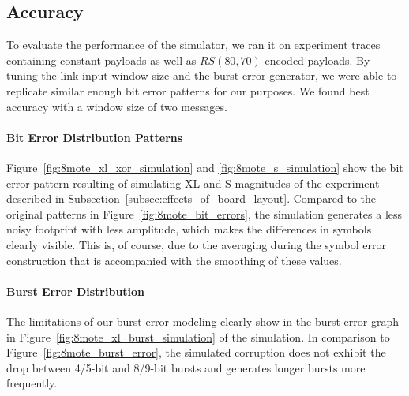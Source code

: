 \subsection{Accuracy}
\label{subsec:simulation_accuracy}

To evaluate the performance of the simulator, we ran it on experiment traces containing constant payloads as well as $RS(80,70)$ encoded payloads.
By tuning the link input window size and the burst error generator, we were able to replicate similar enough bit error patterns for our purposes.
We found best accuracy with a window size of two messages.

\paragraph{Bit Error Distribution Patterns}

Figure~\ref{fig:8mote_xl_xor_simulation} and \ref{fig:8mote_s_simulation} show the bit error pattern resulting of simulating XL and S magnitudes of the experiment described in Subsection~\ref{subsec:effects_of_board_layout}.
Compared to the original patterns in Figure~\ref{fig:8mote_bit_errors}, the simulation generates a less noisy footprint with less amplitude, which makes the differences in symbols clearly visible.
This is, of course, due to the averaging during the symbol error construction that is accompanied with the smoothing of these values.

\paragraph{Burst Error Distribution}

The limitations of our burst error modeling clearly show in the burst error graph in Figure~\ref{fig:8mote_xl_burst_simulation} of the simulation. In comparison to Figure~\ref{fig:8mote_burst_error}, the simulated corruption does not exhibit the drop between 4/5-bit and 8/9-bit bursts and generates longer bursts more frequently.

